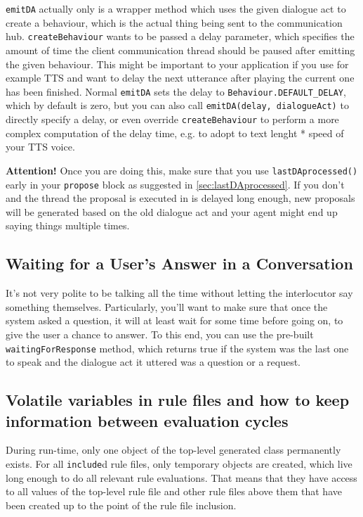\texttt{emitDA} actually only is a wrapper method which uses the given
dialogue act to create a behaviour, which is the actual thing being
sent to the communication hub. \texttt{createBehaviour} wants to be
passed a delay parameter, which specifies the amount of time the
client communication thread should be paused after emitting the given
behaviour. This might be important to your application if you use for
example TTS and want to delay the next utterance after playing the
current one has been finished.  Normal \texttt{emitDA} sets the delay
to \texttt{Behaviour.DEFAULT\_DELAY}, which by default is zero, but
you can also call \texttt{emitDA(delay, dialogueAct)} to directly
specify a delay, or even override \texttt{createBehaviour} to perform
a more complex computation of the delay time, e.g. to adopt to text
lenght * speed of your TTS voice.

\textbf{Attention!} Once you are doing this, make sure that you use
\texttt{lastDAprocessed()} early in your \texttt{propose} block as
suggested in \ref{sec:lastDAprocessed}. If you don't and the thread
the proposal is executed in is delayed long enough, new proposals will
be generated based on the old dialogue act and your agent might end up
saying things multiple times.

\subsection{Waiting for a User's Answer in a Conversation}

It's not very polite to be talking all the time without letting the
interlocutor say something themselves. Particularly, you'll want to
make sure that once the system asked a question, it will at least wait
for some time before going on, to give the user a chance to answer. To
this end, you can use the pre-built \texttt{waitingForResponse}
method, which returns true if the system was the last one to speak and
the dialogue act it uttered was a question or a request.

\subsection{Volatile variables in rule files and how to keep information between evaluation cycles} \label{sec:volatile}

During run-time, only one object of the top-level generated class
permanently exists. For all \texttt{include}d rule files, only
temporary objects are created, which live long enough to do all
relevant rule evaluations. That means that they have access to all
values of the top-level rule file and other rule files above them that
have been created up to the point of the rule file inclusion.

